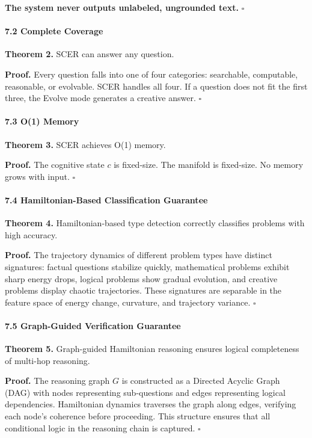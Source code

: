 \documentclass[
  11pt,
  a4paper,
]{article}
\begin{document}
\textbf{The system never outputs unlabeled, ungrounded text.}
\(\square\)

\paragraph{7.2 Complete Coverage}\label{complete-coverage}

\textbf{Theorem 2.} SCER can answer any question.

\textbf{Proof.} Every question falls into one of four categories:
searchable, computable, reasonable, or evolvable. SCER handles all four.
If a question does not fit the first three, the Evolve mode generates a
creative answer. \(\square\)

\paragraph{7.3 O(1) Memory}\label{o1-memory-2}

\textbf{Theorem 3.} SCER achieves O(1) memory.

\textbf{Proof.} The cognitive state \(c\) is fixed-size. The manifold is
fixed-size. No memory grows with input. \(\square\)

\paragraph{7.4 Hamiltonian-Based Classification
Guarantee}\label{hamiltonian-based-classification-guarantee}

\textbf{Theorem 4.} Hamiltonian-based type detection correctly
classifies problems with high accuracy.

\textbf{Proof.} The trajectory dynamics of different problem types have
distinct signatures: factual questions stabilize quickly, mathematical
problems exhibit sharp energy drops, logical problems show gradual
evolution, and creative problems display chaotic trajectories. These
signatures are separable in the feature space of energy change,
curvature, and trajectory variance. \(\square\)

\paragraph{7.5 Graph-Guided Verification
Guarantee}\label{graph-guided-verification-guarantee}

\textbf{Theorem 5.} Graph-guided Hamiltonian reasoning ensures logical
completeness of multi-hop reasoning.

\textbf{Proof.} The reasoning graph \(G\) is constructed as a Directed
Acyclic Graph (DAG) with nodes representing sub-questions and edges
representing logical dependencies. Hamiltonian dynamics traverses the
graph along edges, verifying each node's coherence before proceeding.
This structure ensures that all conditional logic in the reasoning chain
is captured. \(\square\)
\end{document}
